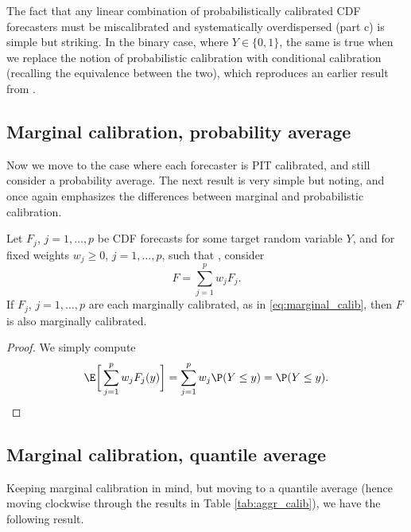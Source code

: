 \documentclass{article}
\begin{document}
The fact that any linear combination of probabilistically calibrated CDF
forecasters must be miscalibrated and systematically overdispersed (part c) is
simple but striking. In the binary case, where $Y \in \{0,1\}$, the same is true
when we replace the notion of probabilistic calibration with conditional
calibration (recalling the equivalence between the two), which reproduces an
earlier result from \citet{ranjan2010combining}.  

\subsection{Marginal calibration, probability average}

Now we move to the case where each forecaster is PIT calibrated, and still
consider a probability average. The next result is very simple but 
noting, and once again emphasizes the differences between marginal and
probabilistic calibration. 

\begin{theorem}
\label{thm:marginal_prob}
Let $F_j$, $j=1,\dots,p$ be CDF forecasts for some target random variable $Y$,
and for fixed weights $w_j \geq 0$, $j=1,\dots,p$, such that
, consider  
\[
F = \sum_{j=1}^p w_j F_j.
\]
If $F_j$, $j=1,\dots,p$ are each marginally calibrated, as in
\eqref{eq:marginal_calib}, then $F$ is also marginally calibrated.  
\end{theorem}

\begin{proof}
We simply compute 
\[
\E\bigg[ \sum_{j=1}^p w_j F_j(y) \bigg] = \sum_{j=1}^p w_j \P(Y \leq y) =  
\P(Y \leq y). 
\]
\end{proof}

\subsection{Marginal calibration, quantile average}

Keeping marginal calibration in mind, but moving to a quantile average (hence
moving clockwise through the results in Table \ref{tab:aggr_calib}), we have the
following result. 
\end{document}
